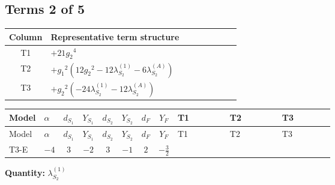 \documentclass[8pt]{article}
\begin{document}
\begin{landscape}
\subsection*{Terms 2 of 5}
\begin{center}
\begin{tabular}{@{}c >{\raggedright\arraybackslash}p{0.82\linewidth}@{}}
\toprule
Column & Representative term structure \\
\midrule
T1 & \(\displaystyle +21 {g_2}^4\) \\
\midrule
T2 & \(\displaystyle +{g_1}^2 \left(12 {g_2}^2-12 {\lambda_{S_2}^{(1)}}-6 {\lambda_{S_2}^{(A)}}\right)\) \\
\midrule
T3 & \(\displaystyle +{g_2}^2 (-24 {\lambda_{S_2}^{(1)}}-12 {\lambda_{S_2}^{(A)}})\) \\
\midrule
\bottomrule
\end{tabular}
\end{center}
\smallskip
\tiny
\begin{longtable}{@{}llcccccc >{\raggedright\arraybackslash}p{0.21\linewidth} >{\raggedright\arraybackslash}p{0.21\linewidth} >{\raggedright\arraybackslash}p{0.21\linewidth}@{}}
\toprule
Model & $\alpha$ & $d_{S_1}$ & $Y_{S_1}$ & $d_{S_2}$ & $Y_{S_2}$ & $d_F$ & $Y_F$ & T1 & T2 & T3 \\
\midrule
\endfirsthead
\toprule
Model & $\alpha$ & $d_{S_1}$ & $Y_{S_1}$ & $d_{S_2}$ & $Y_{S_2}$ & $d_F$ & $Y_F$ & T1 & T2 & T3 \\
\midrule
\endhead
T3-E & $-4$ & $3$ & $-2$ & $3$ & $-1$ & $2$ & $-\frac{3}{2}$ & \scriptsize\adjustbox{max width=\linewidth}{$\begin{gathered} +21 {g_2}^4\end{gathered}$} & \scriptsize\adjustbox{max width=\linewidth}{$\begin{gathered} +{g_1}^2 \left(12 {g_2}^2-12 {\lambda_{S_2}^{(1)}}-6 {\lambda_{S_2}^{(A)}}\right)\end{gathered}$} & \scriptsize\adjustbox{max width=\linewidth}{$\begin{gathered} +{g_2}^2 (-24 {\lambda_{S_2}^{(1)}}-12 {\lambda_{S_2}^{(A)}})\end{gathered}$} \\
\midrule
\bottomrule
\end{longtable}
\clearpage
\noindent\textbf{Quantity: }$\lambda_{S_2}^{(1)}$\par\smallskip

\end{landscape}
\end{document}
